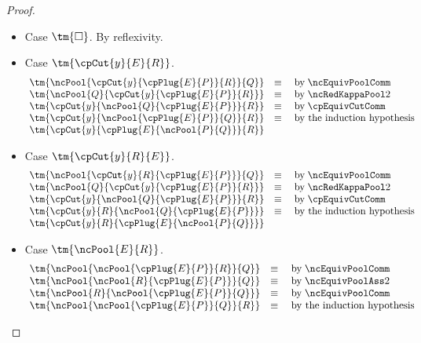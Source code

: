 \documentclass[UKenglish]{llncs}
\begin{document}
\begin{subappendices}
\begin{proof}
\begin{itemize}
    \item
      Case $\tm{\Box}$. By reflexivity.
    \item
      Case $\tm{\cpCut{y}{E}{R}}$.
      \[\!
        \begin{array}{ll}
          \tm{\ncPool{\cpCut{y}{\cpPlug{E}{P}}{R}}{Q}}
          & \equiv \quad \text{by} \; \ncEquivPoolComm \\
          \tm{\ncPool{Q}{\cpCut{y}{\cpPlug{E}{P}}{R}}}
          & \equiv \quad \text{by} \; \ncRedKappaPool2 \\
          \tm{\cpCut{y}{\ncPool{Q}{\cpPlug{E}{P}}}{R}}
          & \equiv \quad \text{by} \; \cpEquivCutComm \\
          \tm{\cpCut{y}{\ncPool{\cpPlug{E}{P}}{Q}}{R}}
          & \equiv \quad \text{by the induction hypothesis}\\
          \tm{\cpCut{y}{\cpPlug{E}{\ncPool{P}{Q}}}{R}}
        \end{array}
      \]
    \item
      Case $\tm{\cpCut{y}{R}{E}}$.
      \[\!
        \begin{array}{ll}
          \tm{\ncPool{\cpCut{y}{R}{\cpPlug{E}{P}}}{Q}}
          & \equiv \quad \text{by} \; \ncEquivPoolComm \\
          \tm{\ncPool{Q}{\cpCut{y}{\cpPlug{E}{P}}{R}}}
          & \equiv \quad \text{by} \; \ncRedKappaPool2 \\
          \tm{\cpCut{y}{\ncPool{Q}{\cpPlug{E}{P}}}{R}}
          & \equiv \quad \text{by} \; \cpEquivCutComm \\
          \tm{\cpCut{y}{R}{\ncPool{Q}{\cpPlug{E}{P}}}}
          & \equiv \quad \text{by the induction hypothesis} \\
          \tm{\cpCut{y}{R}{\cpPlug{E}{\ncPool{P}{Q}}}}
        \end{array}
      \]
    \item
      Case $\tm{\ncPool{E}{R}}$.
      \[\!
        \begin{array}{ll}
          \tm{\ncPool{\ncPool{\cpPlug{E}{P}}{R}}{Q}}
          & \equiv \quad \text{by} \; \ncEquivPoolComm \\
          \tm{\ncPool{\ncPool{R}{\cpPlug{E}{P}}}{Q}}
          & \equiv \quad \text{by} \; \ncEquivPoolAss2 \\
          \tm{\ncPool{R}{\ncPool{\cpPlug{E}{P}}{Q}}}
          & \equiv \quad \text{by} \; \ncEquivPoolComm \\
          \tm{\ncPool{\ncPool{\cpPlug{E}{P}}{Q}}{R}}
          & \equiv \quad \text{by the induction hypothesis} \\

\end{array}\]
\end{itemize}
\end{proof}
\end{subappendices}
\end{document}
